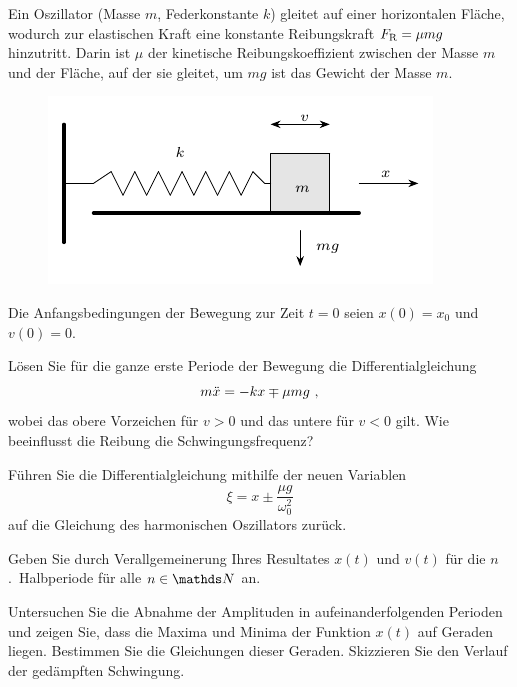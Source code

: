 \begin{atiTask}[
  title = Oszillator auf rauer Unterlage
]
  Ein Oszillator (Masse $m$, Federkonstante $k$) gleitet auf einer horizontalen Fläche, wodurch zur elastischen Kraft eine konstante Reibungskraft $F_{\mathrm{R}} = \mu mg$ hinzutritt.
  Darin ist $\mu$ der kinetische Reibungskoeffizient zwischen der Masse $m$ und der Fläche, auf der sie gleitet, um $mg$ ist das Gewicht der Masse $m$.
  \begin{figure}[H]
    \center
    \includegraphics{task-oszillator_auf_rauer_unterlage-sketch.pdf}
  \end{figure}
  Die Anfangsbedingungen der Bewegung zur Zeit $t=0$ seien $x(0)=x_0$ und $v(0)=0$.
  \begin{atiSubtasks}
    \item{
      Lösen Sie für die ganze erste Periode der Bewegung die Differentialgleichung
      \[
        m \ddot{x} = -kx \mp \mu mg\ ,
      \]
      wobei das obere Vorzeichen für $v>0$ und das untere für $v<0$ gilt.
      Wie beeinflusst die Reibung die Schwingungsfrequenz?

      \begin{atiNote}
        Führen Sie die Differentialgleichung mithilfe der neuen Variablen
        \[
          \xi = x\pm \frac{\mu g}{\omega_0^2}
        \]
        auf die Gleichung des harmonischen Oszillators zurück.
      \end{atiNote}
    }
    \item{
      Geben Sie durch Verallgemeinerung Ihres Resultates $x(t)$ und $v(t)$ für die $n$.~Halbperiode für alle $n\in\setN$ an.
    }
    \item{
      Untersuchen Sie die Abnahme der Amplituden in aufeinanderfolgenden Perioden und zeigen Sie, dass die Maxima und Minima der Funktion $x(t)$ auf Geraden liegen.
      Bestimmen Sie die Gleichungen dieser Geraden.
      Skizzieren Sie den Verlauf der gedämpften Schwingung.
    }
  \end{atiSubtasks}
\end{atiTask}